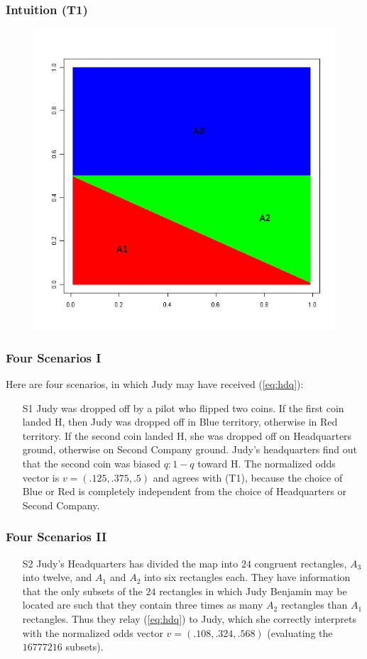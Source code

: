 \documentclass[xcolor=dvipsnames]{beamer}
\begin{document}
\begin{frame}
  \frametitle{Intuition (T1)}
  \begin{figure}[h]
    \includegraphics[scale=.4]{plot-i1.jpg}
  \end{figure}
\end{frame}

\begin{frame}
  \frametitle{Four Scenarios I}
  Here are four scenarios, in which Judy may have received
  ({\ref{eq:hdq}}):
\begin{enumerate}
\item[S1] Judy was dropped off by a pilot who flipped two coins. If
  the first coin landed H, then Judy was dropped off in Blue
  territory, otherwise in Red territory. If the second coin landed H,
  she was dropped off on Headquarters ground, otherwise on Second
  Company ground. Judy's headquarters find out that the second coin
  was biased $q:1-q$ toward H. The normalized odds vector is
  $v=(.125,.375,.5)$ and agrees with (T1), because the choice of Blue
  or Red is completely independent from the choice of Headquarters or
  Second Company.
\end{enumerate}
\end{frame}

\begin{frame}
  \frametitle{Four Scenarios II}
\begin{enumerate}
\item [S2] Judy's Headquarters has divided the map into $24$ congruent
  rectangles, $A_{3}$ into twelve, and $A_{1}$ and $A_{2}$ into six
  rectangles each. They have information that the only subsets of the
  $24$ rectangles in which Judy Benjamin may be located are such that
  they contain three times as many $A_{2}$ rectangles than $A_{1}$
  rectangles. Thus they relay ({\ref{eq:hdq}}) to Judy, which she
  correctly interprets with the normalized odds vector
  $v=(.108,.324,.568)$ (evaluating the $16777216$ subsets).
\end{enumerate}
\end{frame}
\end{document}
